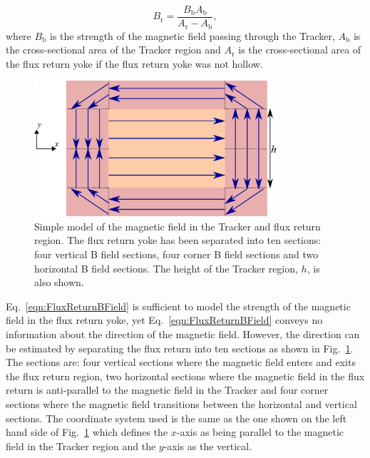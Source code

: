 \begin{equation}
  B_{\textrm{r}} = \frac{B_{\textrm{b}}A_{\textrm{b}}}{A_{\textrm{r}} - A_{\textrm{b}}},
  \label{eqn:FluxReturnBField}
\end{equation}
where $B_{\textrm{b}}$ is the strength of the magnetic field passing through the Tracker, $A_{\textrm{b}}$ is the cross-sectional area of the Tracker region and $A_{\textrm{r}}$ is the cross-sectional area of the flux return yoke if the flux return yoke was not hollow.
\newline
\newline
\begin{figure}
  \centering
  \includegraphics[width=9cm]{images/magnetic_field/BFieldDiagram}
  \caption{Simple model of the magnetic field in the Tracker and flux return region.  The flux return yoke has been separated into ten sections: four vertical B field sections, four corner B field sections and two horizontal B field sections.  The height of the Tracker region, $h$, is also shown.}
  \label{fig:BFieldDiagram}
\end{figure}
Eq.~\ref{eqn:FluxReturnBField} is sufficient to model the strength of the magnetic field in the flux return yoke, yet Eq.~\ref{eqn:FluxReturnBField} conveys no information about the direction of the magnetic field.  However, the direction can be estimated by separating the flux return into ten sections as shown in Fig.~\ref{fig:BFieldDiagram}.  The sections are: four vertical sections where the magnetic field enters and exits the flux return region, two horizontal sections where the magnetic field in the flux return is anti-parallel to the magnetic field in the Tracker and four corner sections where the magnetic field transitions between the horizontal and vertical sections.  The coordinate system used is the same as the one shown on the left hand side of Fig.~\ref{fig:BFieldDiagram} which defines the $x$-axis as being parallel to the magnetic field in the Tracker region and the $y$-axis as the vertical.  
